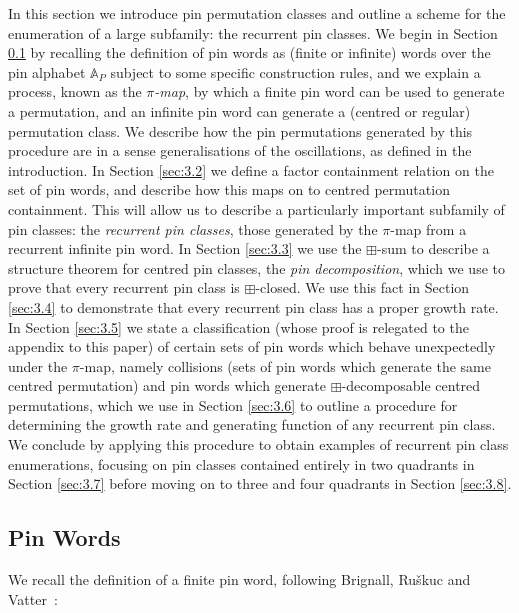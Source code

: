 \documentclass[11pt,a4paper]{article}
\theoremstyle{definition}
\begin{document}
In this section we introduce pin permutation classes and outline a scheme for the enumeration of a large subfamily: the recurrent pin classes. We begin in Section \ref{sec:3.1} by recalling the definition of pin words as (finite or infinite) words over the pin alphabet $\mathbb{A}_{P}$ subject to some specific construction rules, and we explain a process, known as the \emph{$\pi$-map}, by which a finite pin word can be used to generate a permutation, and an infinite pin word can generate a (centred or regular) permutation class. We describe how the pin permutations generated by this procedure are in a sense generalisations of the oscillations, as defined in the introduction. In Section \ref{sec:3.2} we define a factor containment relation on the set of pin words, and describe how this maps on to centred permutation containment. This will allow us to describe a particularly important subfamily of pin classes: the \emph{recurrent pin classes}, those generated by the $\pi$-map from a recurrent infinite pin word. In Section \ref{sec:3.3} we use the $\boxplus$-sum to describe a structure theorem for centred pin classes, the \emph{pin decomposition}, which we use to prove that every recurrent pin class is $\boxplus$-closed. We use this fact in Section \ref{sec:3.4} to demonstrate that every recurrent pin class has a proper growth rate. In Section \ref{sec:3.5} we state a classification (whose proof is relegated to the appendix to this paper) of certain sets of pin words which behave unexpectedly under the $\pi$-map, namely collisions (sets of pin words which generate the same centred permutation) and pin words which generate $\boxplus$-decomposable centred permutations, which we use in Section \ref{sec:3.6} to outline a procedure for determining the growth rate and generating function of any recurrent pin class. We conclude by applying this procedure to obtain examples of recurrent pin class enumerations, focusing on pin classes contained entirely in two quadrants in Section \ref{sec:3.7} before moving on to three and four quadrants in Section \ref{sec:3.8}.

\subsection{Pin Words} \label{sec:3.1}

We recall the definition of a finite pin word, following Brignall, Ru\v{s}kuc and Vatter~\cite{brignall:simple-permutat:b}:
\end{document}
